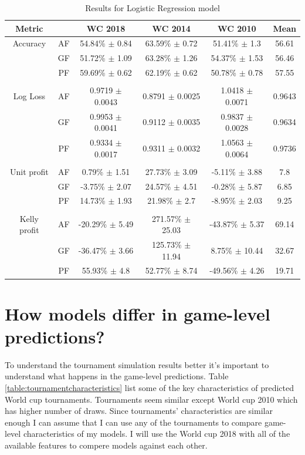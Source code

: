 \begin{table}
    \caption{Results for Logistic Regression model}
    \begin{tabular}{| c  c| c| c| c|c|}
        \hline
        Metric & & \textbf{WC 2018} & \textbf{WC 2014} & \textbf{WC 2010}& Mean\\
        \hline
        Accuracy & AF & 54.84\% $\pm$ 0.84 & 63.59\% $\pm$ 0.72 & 51.41\% $\pm$ 1.3& 56.61 \\
         & GF & 51.72\% $\pm$ 1.09 & 63.28\% $\pm$ 1.26 & 54.37\% $\pm$ 1.53& 56.46 \\
         & PF & 59.69\% $\pm$ 0.62 & 62.19\% $\pm$ 0.62 & 50.78\% $\pm$ 0.78& 57.55 \\
         & & & & & \\
        Log Loss & AF & 0.9719 $\pm$ 0.0043 & 0.8791 $\pm$ 0.0025 & 1.0418 $\pm$ 0.0071& 0.9643 \\
         & GF & 0.9953 $\pm$ 0.0041 & 0.9112 $\pm$ 0.0035 & 0.9837 $\pm$ 0.0028& 0.9634 \\
         & PF & 0.9334 $\pm$ 0.0017 & 0.9311 $\pm$ 0.0032 & 1.0563 $\pm$ 0.0064& 0.9736 \\
         & & & & & \\
        Unit profit & AF & 0.79\% $\pm$ 1.51 & 27.73\% $\pm$ 3.09 & -5.11\% $\pm$ 3.88& 7.8 \\
         & GF & -3.75\% $\pm$ 2.07 & 24.57\% $\pm$ 4.51 & -0.28\% $\pm$ 5.87& 6.85 \\
         & PF & 14.73\% $\pm$ 1.93 & 21.98\% $\pm$ 2.7 & -8.95\% $\pm$ 2.03& 9.25 \\
         & & & & & \\
        Kelly profit & AF & -20.29\% $\pm$ 5.49 & 271.57\% $\pm$ 25.03 & -43.87\% $\pm$ 5.37& 69.14 \\
         & GF & -36.47\% $\pm$ 3.66 & 125.73\% $\pm$ 11.94 & 8.75\% $\pm$ 10.44& 32.67 \\
         & PF & 55.93\% $\pm$ 4.8 & 52.77\% $\pm$ 8.74 & -49.56\% $\pm$ 4.26& 19.71 \\
 \hline
    \end{tabular}
    \label{table:linearmodel}
\end{table}

\section{How models differ in game-level predictions?}
To understand the tournament simulation results better it's important to understand what happens in the game-level predictions. Table \ref{table:tournamentcharacteristics} list some of the key characteristics of predicted World cup tournaments. Tournaments seem similar except World cup 2010 which has higher number of draws. Since tournaments' characteristics are similar enough I can assume that I can use any of the tournaments to compare game-level characteristics of my models. I will use the World cup 2018 with all of the available features to compere models against each other.

